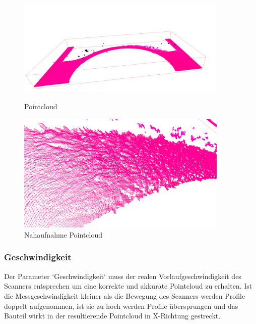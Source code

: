 \documentclass[../main.tex]{subfiles}
\begin{document}
\begin{figure}[h]
    \centering
    \begin{minipage}{0.45\textwidth}
        \centering
        \includegraphics[width=0.9\textwidth]{images/pointcloud_big.PNG} %
        \caption{Pointcloud}
        \label{fig:pointcloud_big}
    \end{minipage}\hfill
    \begin{minipage}{0.45\textwidth}
        \centering
        \includegraphics[width=0.9\textwidth]{images/pointcloud_small.PNG} %
        \caption{Nahaufnahme Pointcloud}
        \label{fig:pointcloud_small}
    \end{minipage}
\end{figure}

\subsubsection{Geschwindigkeit}
Der Parameter `Geschwindigkeit` muss der realen Vorlaufgeschwindigkeit des Scanners
entsprechen um eine korrekte und akkurate Pointcloud zu erhalten. Ist die 
Messgeschwindigkeit kleiner als die Bewegung des Scanners werden Profile doppelt 
aufgenommen, ist sie zu hoch werden Profile übersprungen und das Bauteil wirkt in 
der resultierende Pointcloud in X-Richtung gestreckt.
\end{document}
